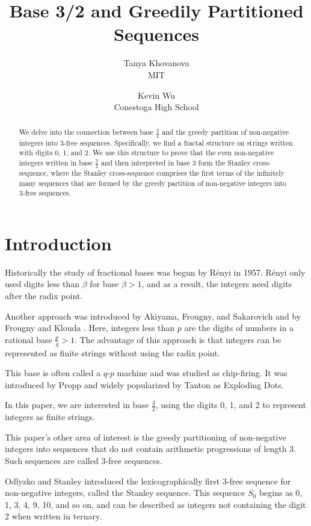 \documentclass[12pt,reqno]{article}
\title{Base 3/2 and Greedily Partitioned Sequences}
\author{Tanya Khovanova\\MIT \and Kevin Wu\\Conestoga High School}
\date{}
\theoremstyle{plain}
\theoremstyle{definition}
\theoremstyle{remark}
\begin{document}
\maketitle

\begin{abstract}
We delve into the connection between base $\frac{3}{2}$ and the greedy partition of non-negative integers into 3-free sequences. Specifically, we find a fractal structure on strings written with digits 0, 1, and 2. We use this structure to prove that the even non-negative integers written in base $\frac{3}{2}$ and then interpreted in base 3 form the Stanley cross-sequence, where the Stanley cross-sequence comprises the first terms of the infinitely many sequences that are formed by the greedy partition of non-negative integers into 3-free sequences.
\end{abstract}

\section{Introduction}

Historically the study of fractional bases was begun by R\'{e}nyi \cite{R} in 1957. R\'{e}nyi only used digits less than $\beta$ for base $\beta > 1$, and as a result, the integers need digits after the radix point. 

Another approach was introduced by Akiyama, Frougny, and Sakarovich \cite{AFS} and by Frougny and Klouda \cite{FK}. Here, integers less than $p$ are the digits of numbers in a rational base $\frac{p}{q} > 1$. The advantage of this approach is that integers can be represented as finite strings without using the radix point. 

This base is often called a $q$-$p$ machine and was studied as chip-firing. It was introduced by Propp \cite{JP} and widely popularized by Tanton \cite{JT} as Exploding Dots.

In this paper, we are interested in base $\frac{3}{2}$, using the digits 0, 1, and 2 to represent integers as finite strings.

This paper's other area of interest is the greedy partitioning of non-negative integers into sequences that do not contain arithmetic progressions of length 3. Such sequences are called 3-free sequences.

Odlyzko and Stanley \cite{OS} introduced the lexicographically first 3-free sequence for non-negative integers, called the Stanley sequence. This sequence $S_0$ begins as 0, 1, 3, 4, 9, 10, and so on, and can be described as integers not containing the digit 2 when written in ternary.
\end{document}
